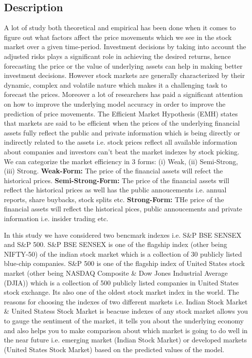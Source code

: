 \documentclass[conference]{IEEEtran}
\begin{document}
\subsection{Description}
A lot of study both theoretical and empirical has been done when it comes to figure out what factors affect the price movements which we see in the stock market over a given time-period. Investment decisions by taking into account the adjusted risks plays a significant role in achieving the desired returns, hence forecasting the price or the value of underlying assets can help in making better investment decisions. However stock markets are generally characterized by their dynamic, complex and volatile nature which makes it a challenging task to forecast the prices. Moreover a lot of researchers has paid a significant attention on how to improve the underlying model accuracy in order to improve the prediction of price movements. The Efficient Market Hypothesis (EMH) states that markets are said to be efficient when the prices of the underlying financial assets fully reflect the public and private information which is being directly or indirectly related to the assets \cite{b1} i.e. stock prices reflect all available information about companies and investors can’t beat the market indexes by stock picking. We can categorize the market efficiency in 3 forms: (i) Weak, (ii) Semi-Strong, (iii) Strong. \newline
\textbf{Weak-Form:} The price of the financial assets will refect the historical prices. \newline
\textbf{Semi-Strong-Form:} The price of the financial assets will reflect the historical prices as well has the public annoucements i.e. annual reports, share buybacks, stock splits etc. \newline
\textbf{Strong-Form:} THe price of the financial assets will reflect the historical pices, public annoucements and private information i.e. insider trading etc.

In this study we have considered two bencmark indexes i.e. S\&P BSE SENSEX and S\&P 500. S\&P BSE SENSEX is one of the flagship index (other being NIFTY-50) of the indian stock market which is a collection of 30 publicly listed blue-chip companies. S\&P 500 is one of the flagship index of United States stock market (other being NASDAQ Composite \& Dow Jones Industrial Average (DJIA)) which is a collection of 500 publicly listed companies in United States stock exchange. Its also one of the oldest stock market index in the world.
The reasons for choosing the indexes of two different markets i.e. Indian Stock Market \& United Statess Stock Market is beacuse indexes of any stock market allows you to gauge the sentiment of the market, it tells you about the underlying economy and also helps you to make comparison about which market is going to do well in the near future i.e. emerging market (Indian Stock Market) or developed markets (United States Stock Market) based on the predicted values of the model.
\end{document}
